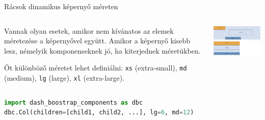 \documentclass[english, aspectratio=169]{beamer}
\begin{document}
	\begin{frame}[fragile]{Rácsok dinamikus képernyő méreten}
		\begin{columns}
			\begin{column}{.4\textwidth}
				Vannak olyan esetek, amikor nem kívánatos az elemek méretezése a képernyővel együtt. Amikor a képernyő kisebb lesz, némelyik komponenseknek jó, ha kiterjednek méretükben.\par\smallskip
				Öt különböző méretet lehet definiálni: \texttt{xs} (extra-small), \texttt{md} (medium), \texttt{lg} (large), \texttt{xl} (extra-large).
			\end{column}
			\begin{column}{.6\textwidth}
				\begin{center}
					\includegraphics[width=7cm, keepaspectratio]{images/dash_10.png}
				\end{center}
			\end{column}
		\end{columns}
		\vspace{0.2cm}
		\begin{center}
			\begin{lstlisting}[language=python]
import dash_boostrap_components as dbc
dbc.Col(children=[child1, child2, ...], lg=6, md=12)
			\end{lstlisting}
		\end{center}
	\end{frame}
	
\end{document}

